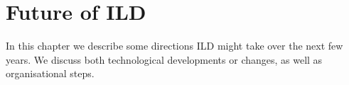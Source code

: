 \chapter{Future of ILD}

In this chapter we describe some directions ILD might take over the next few years. We discuss both technological developments or changes, as well as organisational steps. 